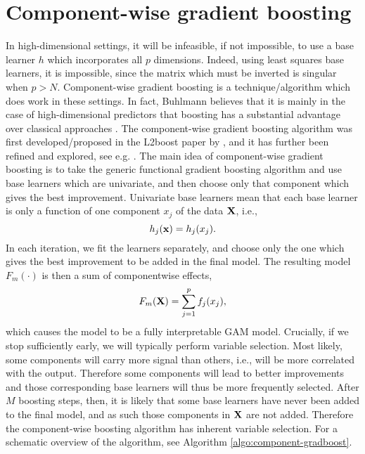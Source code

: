 \section{Component-wise gradient boosting}
In high-dimensional settings, it will be infeasible, if not impossible, to use a base learner $h$ which incorporates all $p$ dimensions. Indeed, using least squares base learners, it is impossible, since the matrix which must be inverted is singular when $p>N$. Component-wise gradient boosting is a technique/algorithm which does work in these settings. In fact, Buhlmann believes that it is mainly in the case of high-dimensional predictors that boosting has a substantial advantage over classical approaches \citep{buhlmann2006}. The component-wise gradient boosting algorithm was first developed/proposed in the L2boost paper by \citet{buhlmann-yu}, and it has further been refined and explored, see e.g. \citet{buhlmann2006}. The main idea of component-wise gradient boosting is to take the generic functional gradient boosting algorithm and use base learners which are univariate, and then choose only that component which gives the best improvement. Univariate base learners mean that each base learner is only a function of one component $x_j$ of the data $\mathbf{X}$, i.e.,
\begin{equation*}
    h_j(\mathbf{x})=h_j(x_j).
\end{equation*}
In each iteration, we fit the learners separately, and choose only the one which gives the best improvement to be added in the final model. The resulting model $F_m(\cdot)$ is then a sum of componentwise effects,
\begin{equation*}
    F_m(\mathbf{X})=\sum_{j=1}^pf_j(x_j),
\end{equation*}
which causes the model to be a fully interpretable GAM model. Crucially, if we stop sufficiently early, we will typically perform variable selection. Most likely, some components will carry more signal than others, i.e., will be more correlated with the output. Therefore some components will lead to better improvements and those corresponding base learners will thus be more frequently selected. After $M$ boosting steps, then, it is likely that some base learners have never been added to the final model, and as such those components in $\mathbf{X}$ are not added. Therefore the component-wise boosting algorithm has inherent variable selection. For a schematic overview of the algorithm, see Algorithm \ref{algo:component-gradboost}.
